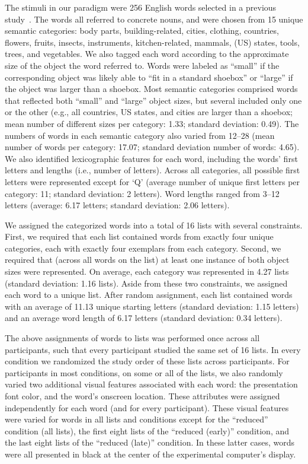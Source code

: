 \documentclass[11pt]{article}
\begin{document}
The stimuli in our paradigm were 256 English words selected in a previous
study~\citep{ZimaEtal18}. The words all referred to concrete nouns, and were
chosen from 15 unique semantic categories: body parts, building-related,
cities, clothing, countries, flowers, fruits, insects, instruments,
kitchen-related, mammals, (US) states, tools, trees, and vegetables. We also
tagged each word according to the approximate size of the object the word
referred to. Words were labeled as ``small'' if the corresponding object was
likely able to ``fit in a standard shoebox'' or ``large'' if the object was
larger than a shoebox. Most semantic categories comprised words that reflected
both ``small'' and ``large'' object sizes, but several included only one or the
other (e.g., all countries, US states, and cities are larger than a shoebox;
mean number of different sizes per category: 1.33; standard deviation: 0.49).
The numbers of words in each semantic category also varied from 12--28 (mean
number of words per category: 17.07; standard deviation number of words: 4.65).
We also identified lexicographic features for each word, including the words'
first letters and lengths (i.e., number of letters). Across all categories, all
possible first letters were represented except for `Q' (average number of
unique first letters per category: 11; standard deviation: 2 letters). Word
lengths ranged from 3--12 letters (average: 6.17 letters; standard deviation:
2.06 letters).

We assigned the categorized words into a total of 16 lists with several
constraints. First, we required that each list contained words from exactly
four unique categories, each with exactly four exemplars from each category.
Second, we required that (across all words on the list) at least one instance
of both object sizes were represented. On average, each category was
represented in 4.27 lists (standard deviation: 1.16 lists). Aside from these
two constraints, we assigned each word to a unique list. After random
assignment, each list contained words with an average of 11.13 unique starting
letters (standard deviation: 1.15 letters) and an average word length of 6.17
letters (standard deviation: 0.34 letters).

The above assignments of words to lists was performed once across all
participants, such that every participant studied the same set of 16 lists. In
every condition we randomized the study order of these lists across
participants. For participants in most conditions, on some or all of the lists,
we also randomly varied two additional visual features associated with each
word: the presentation font color, and the word's onscreen location. These
attributes were assigned independently for each word (and for every
participant). These visual features were varied for words in all lists and
conditions except for the ``reduced'' condition (all lists), the first eight
lists of the ``reduced (early)'' condition, and the last eight lists of the
``reduced (late)'' condition. In these latter cases, words were all presented
in black at the center of the experimental computer's display.
\end{document}
